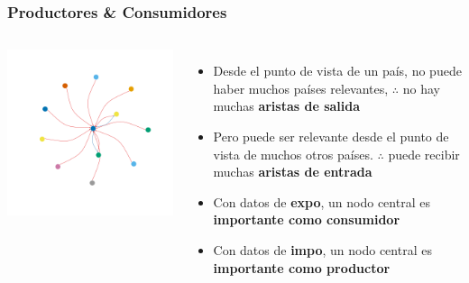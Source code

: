 \documentclass[compress]{beamer}
\begin{document}
\begin{frame}
\frametitle{Productores \& Consumidores}	
\begin{columns}
\includegraphics[width=\linewidth]{toy_graph1}

\begin{itemize}[label=\faRebel]
	\item Desde el punto de vista de un país, no puede haber muchos países relevantes, $\therefore$ no hay muchas \textbf{aristas de salida}
	\item Pero puede ser relevante desde el punto de vista de muchos otros países.
	$\therefore$ puede recibir muchas \textbf{aristas de entrada}
	\item Con datos de \textbf{expo}, un nodo central es \textbf{importante como consumidor}
	\item Con datos de \textbf{impo}, un nodo central es \textbf{importante como productor}
\end{itemize}	
\end{columns}	
\end{frame}
\end{document}
